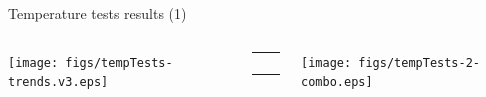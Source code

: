 \documentclass[compress,red]{beamer}
\begin{document}
\begin{frame}{Temperature tests results (1)}


  \begin{columns}[c]
		\hspace{-1.0cm}
		\begin{center}
		\texttt{[image: figs/tempTests-trends.v3.eps]}
		\end{center}

		\begin{center}
		  \begin{table}[!t] \footnotesize 
		  \begin{tabular}{ c  c }     
		  \multicolumn{2}{c}{ }       \\         
		   \multicolumn{2}{c}{ }       \\    
		     &    \\ 
		    &     \\ 
		  \end{tabular}
		  \end{table}   		
		\end{center}

		\hspace{-0.8cm}
		\begin{center}
		\texttt{[image: figs/tempTests-2-combo.eps]}
		\end{center}


\end{columns}
\end{frame}
\end{document}
